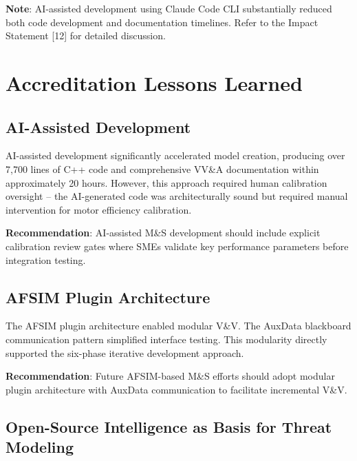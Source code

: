 \documentclass[11pt, letterpaper]{article}
\begin{document}
\unclass \textbf{Note}: AI-assisted development using Claude Code CLI substantially reduced both code development and documentation timelines. Refer to the Impact Statement [12] for detailed discussion.

\pagebreak


\section{\unclass Accreditation Lessons Learned}

\subsection{\unclass AI-Assisted Development}

\unclass AI-assisted development significantly accelerated model creation, producing over 7,700 lines of C++ code and comprehensive VV\&A documentation within approximately 20 hours. However, this approach required human calibration oversight -- the AI-generated code was architecturally sound but required manual intervention for motor efficiency calibration.

\unclass \textbf{Recommendation}: AI-assisted M\&S development should include explicit calibration review gates where SMEs validate key performance parameters before integration testing.

\subsection{\unclass AFSIM Plugin Architecture}

\unclass The AFSIM plugin architecture enabled modular V\&V. The AuxData blackboard communication pattern simplified interface testing. This modularity directly supported the six-phase iterative development approach.

\unclass \textbf{Recommendation}: Future AFSIM-based M\&S efforts should adopt modular plugin architecture with AuxData communication to facilitate incremental V\&V.

\subsection{\unclass Open-Source Intelligence as Basis for Threat Modeling}
\end{document}
